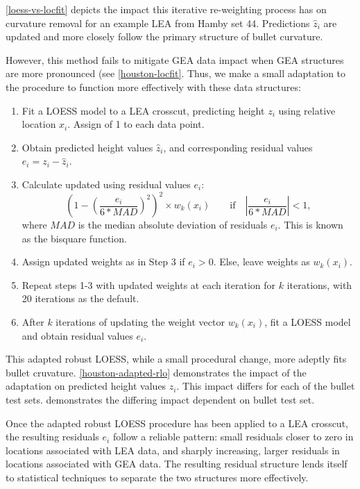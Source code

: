 \documentclass[12pt]{article}
\begin{document}
\autoref{loess-vs-locfit} depicts the impact this iterative re-weighting
process has on curvature removal for an example LEA from Hamby set 44.
Predictions \(\widehat{z}_i\) are updated and more closely follow the
primary structure of bullet curvature.

However, this method fails to mitigate GEA data impact when GEA
structures are more pronounced (see \autoref{houston-locfit}. Thus, we
make a small adaptation to the procedure to function more effectively
with these data structures:

\begin{enumerate}

\item Fit a LOESS model to a LEA crosscut, predicting height $z_i$ using relative location $x_i$. Assign  of 1 to each data point.  
\item Obtain predicted height values $\widehat{z}_i$, and corresponding residual values $e_i = z_i - \widehat{z}_i$. 
\item Calculate updated  using residual values $e_i$: 
$$\left(1 - \left(\frac{e_i}{6*MAD}\right)^2\right)^2 \times w_k(x_i) \quad \quad \mbox{if}\quad \left|\frac{e_i}{6*MAD} \right| < 1,$$
where $MAD$ is the median absolute deviation of residuals $e_i$. This is known as the bisquare function.  
\item Assign updated weights as in Step 3 if $e_i > 0$. Else, leave weights as $w_k(x_i)$. 
\item Repeat steps 1-3 with updated weights at each iteration for $k$ iterations, with 20 iterations as the default.  
\item After $k$ iterations of updating the weight vector $w_k(x_i)$, fit a LOESS model and obtain residual values $e_i$.  

\end{enumerate}

This adapted robust LOESS, while a small procedural change, more adeptly
fits bullet cruvature. \autoref{houston-adapted-rlo} demonstrates the
impact of the adaptation on predicted height values \(z_i\). This impact
differs for each of the bullet test sets.
 demonstrates the differing
impact dependent on bullet test set.

Once the adapted robust LOESS procedure has been applied to a LEA
crosscut, the resulting residuals \(e_i\) follow a reliable pattern:
small residuals closer to zero in locations associated with LEA data,
and sharply increasing, larger residuals in locations associated with
GEA data. The resulting residual structure lends itself to statistical
techniques to separate the two structures more effectively.
\end{document}
